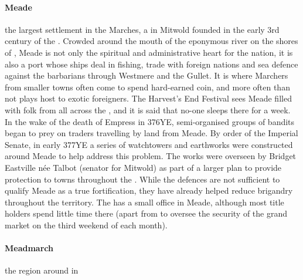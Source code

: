 \paragraph{Meade} the largest settlement in the Marches, a  in Mitwold founded in the early 3rd century of the . Crowded around the mouth of the eponymous river on the shores of , Meade is not only the spiritual and administrative heart for the nation, it is also a port whose ships deal in fishing, trade with foreign nations and sea defence against the barbarians through Westmere and the Gullet. It is where Marchers from smaller towns often come to spend hard-earned coin, and more often than not plays host to exotic foreigners. \localpar The Harvest's End Festival sees Meade filled with folk from all across the , and it is said that no-one sleeps there for a week. In the wake of the death of Empress  in 376YE, semi-organised groups of bandits began to prey on traders travelling by land from Meade. \localpar By order of the Imperial Senate, in early 377YE a series of watchtowers and earthworks were constructed around Meade to help address this problem. The works were overseen by Bridget Eastville née Talbot (senator for Mitwold) as part of a larger plan to provide protection to towns throughout the . While the defences are not sufficient to qualify Meade as a true fortification, they have already helped reduce brigandry throughout the territory. The  has a small office in Meade, although most title holders spend little time there (apart from to oversee the security of the grand market on the third weekend of each month).  
\paragraph{Meadmarch} the region around  in 
